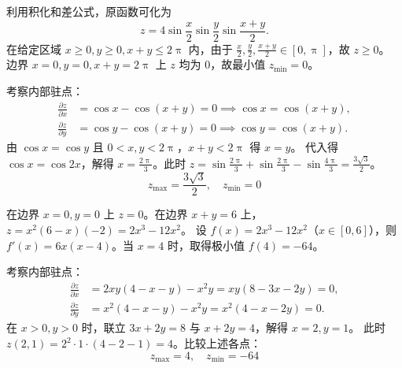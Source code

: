 \begin{solution}
    利用积化和差公式，原函数可化为
    \begin{equation}
        z = 4 \sin \frac{x}{2} \sin \frac{y}{2} \sin \frac{x + y}{2}.
    \end{equation}
    在给定区域 $x \ge 0, y \ge 0, x + y \le 2\uppi$ 内，由于 $\frac{x}{2}, \frac{y}{2}, \frac{x + y}{2} \in [0, \uppi]$，故 $z \ge 0$。
    边界 $x = 0, y = 0, x + y = 2\uppi$ 上 $z$ 均为 $0$，故最小值 $z_{\min} = 0$。

    考察内部驻点：
    \begin{equation}
        \begin{aligned}
            \frac{\partial z}{\partial x} & = \cos x - \cos(x + y) = 0 \implies \cos x = \cos(x + y), \\
            \frac{\partial z}{\partial y} & = \cos y - \cos(x + y) = 0 \implies \cos y = \cos(x + y).
        \end{aligned}
    \end{equation}
    由 $\cos x = \cos y$ 且 $0 < x, y < 2\uppi$，$x + y < 2\uppi$ 得 $x = y$。
    代入得 $\cos x = \cos 2x$，解得 $x = \frac{2\uppi}{3}$。此时 $z = \sin \frac{2\uppi}{3} + \sin \frac{2\uppi}{3} - \sin \frac{4\uppi}{3} = \frac{3\sqrt{3}}{2}$。
    \begin{equation}
        \boxed{z_{\max} = \frac{3\sqrt{3}}{2}, \quad z_{\min} = 0}
    \end{equation}

    在边界 $x = 0, y = 0$ 上 $z = 0$。在边界 $x + y = 6$ 上，$z = x^2(6 - x)(-2) = 2x^3 - 12x^2$。
    设 $f(x) = 2x^3 - 12x^2$（$x \in [0, 6]$），则 $f'(x) = 6x(x - 4)$。当 $x = 4$ 时，取得极小值 $f(4) = -64$。

    考察内部驻点：
    \begin{equation}
        \begin{aligned}
            \frac{\partial z}{\partial x} & = 2xy(4 - x - y) - x^2 y = xy(8 - 3x - 2y) = 0, \\
            \frac{\partial z}{\partial y} & = x^2(4 - x - y) - x^2 y = x^2(4 - x - 2y) = 0.
        \end{aligned}
    \end{equation}
    在 $x > 0, y > 0$ 时，联立 $3x + 2y = 8$ 与 $x + 2y = 4$，解得 $x = 2, y = 1$。
    此时 $z(2, 1) = 2^2 \cdot 1 \cdot (4 - 2 - 1) = 4$。比较上述各点：
    \begin{equation}
        \boxed{z_{\max} = 4, \quad z_{\min} = -64}
    \end{equation}
\end{solution}


